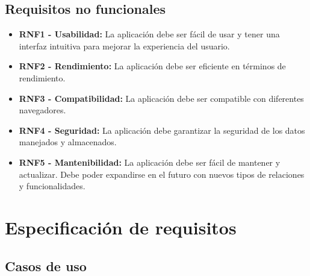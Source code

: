 \newpage

\subsection{Requisitos no funcionales}
\begin{itemize}
\tightlist
\item \textbf{RNF1 - Usabilidad:} La aplicación debe ser fácil de usar y tener una interfaz intuitiva para mejorar la experiencia del usuario.
\item \textbf{RNF2 - Rendimiento:} La aplicación debe ser eficiente en términos de rendimiento.
\item \textbf{RNF3 - Compatibilidad:} La aplicación debe ser compatible con diferentes navegadores.
\item \textbf{RNF4 - Seguridad:} La aplicación debe garantizar la seguridad de los datos manejados y almacenados.
\item \textbf{RNF5 - Mantenibilidad:} La aplicación debe ser fácil de mantener y actualizar. Debe poder expandirse en el futuro con nuevos tipos de relaciones y funcionalidades.
\end{itemize}
\clearpage

\section{Especificación de requisitos}

\subsection{Casos de uso}

